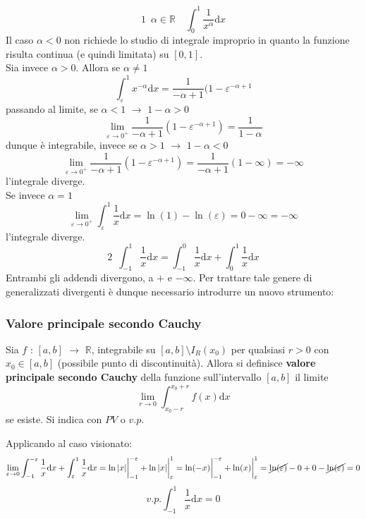 \documentclass[10pt]{article}
\theoremstyle{plain}
\begin{document}
\[\boxed{1} \enspace \alpha \in \mathbb{R} \quad \int_0^1 \frac{1}{x^\alpha}\textrm{d}x\]
Il caso $\alpha < 0$ non richiede lo studio di integrale improprio in quanto la funzione risulta continua (e quindi limitata) su $[0,1]$.
\\Sia invece $\alpha > 0$. Allora se $\alpha \neq 1$
\[\int_\varepsilon^1 x^{-\alpha}\textrm{d}x = \frac{1}{-\alpha + 1}(1 - \varepsilon^{-\alpha + 1}\]
passando al limite, se $\alpha < 1$ $\rightarrow$ $1 - \alpha > 0$
\[\lim\limits_{\varepsilon \rightarrow 0^+} \frac{1}{-\alpha + 1}(1 - \varepsilon^{-\alpha + 1}) = \frac{1}{1 - \alpha}\]
dunque è integrabile, invece se $\alpha > 1$ $\rightarrow$ $1- \alpha <0$
\[\lim\limits_{\varepsilon \rightarrow 0^+} \frac{1}{-\alpha + 1}(1 - \varepsilon^{-\alpha + 1}) = \frac{1}{-\alpha + 1}(1 - \infty) = - \infty\]
l'integrale diverge.
\\Se invece $\alpha = 1$
\[\lim\limits_{\varepsilon \rightarrow 0^+} \int_\varepsilon^1 \frac{1}{x}\textrm{d}x = \ln(1) - \ln(\varepsilon) = 0 - \infty = - \infty\]
l'integrale diverge.
\[\boxed{2} \enspace \int_{-1}^1 \frac{1}{x}\textrm{d}x = \int_{-1}^0 \frac{1}{x}\textrm{d}x + \int_{0}^1 \frac{1}{x}\textrm{d}x\]
Entrambi gli addendi divergono, a $+$ e $- \infty$. Per trattare tale genere di generalizzati divergenti è dunque necessario introdurre un nuovo strumento:

\subsubsection{Valore principale secondo Cauchy}
\begin{defin}
    Sia $f$ : $[a,b]$ $\rightarrow$ $\mathbb{R}$, integrabile su $[a,b] \setminus I_R(x_0)$ per qualsiasi $r>0$ con $x_0 \in [a,b]$ (possibile punto di discontinuità). Allora si definisce \textbf{valore principale secondo Cauchy} della funzione sull'intervallo $[a,b]$ il limite
    \[\lim\limits_{r \rightarrow 0} \int_{x_0 - r}^{x_0 + r} f(x) \textrm{d}x\]
    se esiste. Si indica con $PV$ o $v.p.$
\end{defin}

Applicando al caso visionato:
\[\lim\limits_{\varepsilon \rightarrow 0} \int_{-1}^{-\varepsilon} \frac{1}{x}\textrm{d}x + \int_{\varepsilon}^1 \frac{1}{x}\textrm{d}x = \ln|x|\bigg|_{-1}^{-\varepsilon} + \ln|x|\bigg|_{\varepsilon}^1 = \ln(-x)\bigg|_{-1}^{-\varepsilon} + \ln(x)\bigg|_{\varepsilon}^1 = \cancel{\ln(\varepsilon)} - 0 + 0 - \cancel{\ln(\varepsilon)} = 0\]
\[v.p. \int_{-1}^1 \frac{1}{x}\textrm{d}x = 0\]
\end{document}
